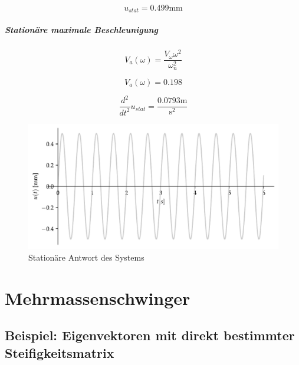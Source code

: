 \documentclass[
  letterpaper,
  DIV=11]{scrreprt}
\begin{document}
\begin{equation}u_{stat} = 0.499 \text{mm}\end{equation}

\hypertarget{stationuxe4re-maximale-beschleunigung}{%
\subsubsection{Stationäre maximale
Beschleunigung}\label{stationuxe4re-maximale-beschleunigung}}

\begin{equation}V_{a}{\left(\omega \right)} = \frac{V_{\omega} \omega^{2}}{\omega_{n}^{2}}\end{equation}

\begin{equation}V_{a}{\left(\omega \right)} = 0.198\end{equation}

\begin{equation}\frac{d^{2}}{d t^{2}} u_{stat} = \frac{0.0793 \text{m}}{\text{s}^{2}}\end{equation}

\begin{figure}[H]

{\centering \includegraphics{index_files/mediabag/ems_07_files/figure-pdf/fig-ems_untilg_stationaer_antwort-output-1.pdf}

}

\caption{\label{fig-ems_untilg_stationaer_antwort}Stationäre Antwort des
Systems}

\end{figure}

\part{Mehrmassenschwinger}

\hypertarget{sec-mms_steif}{%
\chapter{Beispiel: Eigenvektoren mit direkt bestimmter
Steifigkeitsmatrix}\label{sec-mms_steif}}
\end{document}

